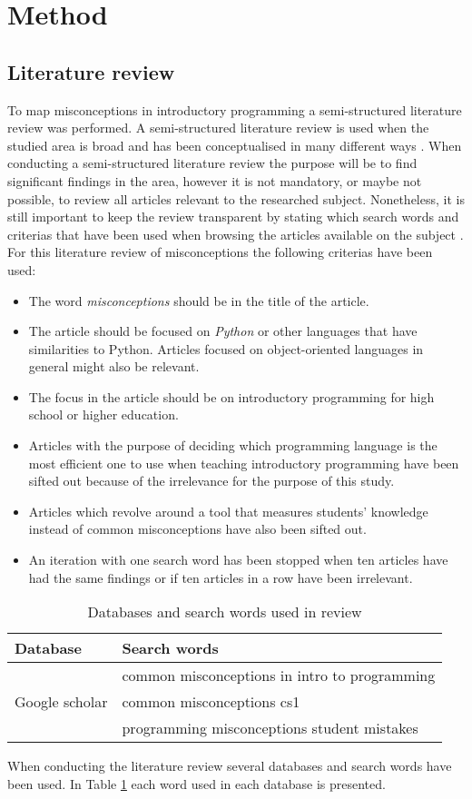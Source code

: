 \section{Method}
\subsection{Literature review}
To map misconceptions in introductory programming a semi-structured 
literature review was performed. A semi-structured literature review is used 
when the studied area is broad and has been conceptualised in many different 
ways \parencite{Snyder2019}. When conducting a semi-structured literature 
review the purpose will be to find significant findings in the area, however 
it is not mandatory, or maybe not possible, to review all articles relevant 
to the researched subject. Nonetheless, it is still important to keep the 
review transparent by stating which search words and criterias that have been 
used when browsing the articles available on the subject 
\parencite{Snyder2019}.
For this literature review of misconceptions the following criterias have 
been used:
\begin{itemize}
\item The word \emph{misconceptions} should be in the title of the article.
\item The article should be focused on \emph{Python} or other languages that 
have similarities to Python. Articles focused on object-oriented languages in 
general might also be relevant.
\item The focus in the article should be on introductory programming for high 
school or higher education.
\item Articles with the purpose of deciding which programming language is the 
most efficient one to use when teaching introductory programming have been 
sifted out because of the irrelevance for the purpose of this study.
\item Articles which revolve around a tool that measures students' knowledge 
instead of common misconceptions have also been sifted out.
\item An iteration with one search word has been stopped when ten articles 
have had the same findings or if ten articles in a row have been irrelevant.
\end{itemize}
\begin{table}[h]
\centering
\begin{tabular}{ll}
\toprule
Database & Search words\\
\midrule
\multirow{3}{4em}{Google scholar} & common misconceptions in intro to 
programming \\
& common misconceptions cs1 \\
& programming misconceptions student mistakes \\
\bottomrule
\end{tabular}
\caption{Databases and search words used in review}
\label{databasesandwords}
\end{table}
When conducting the literature review several databases and search words have 
been used. In Table \ref{databasesandwords} each word used in each database 
is presented.

